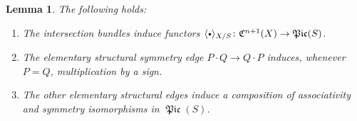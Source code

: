 \documentclass[11pt]{article}
\newcommand{\sbullet}{{\scriptscriptstyle\bullet}}
\newcommand{\csbullet}{{\raisebox{1pt}{$\sbullet$}}}
\theoremstyle{plain}
\newtheorem{lemma}[theorem]{Lemma}
\theoremstyle{definition}
\newcommand{\Cfrak}{\mathfrak C}
\DeclareMathOperator{\Picfr}{\mathfrak{Pic}}
\begin{document}
\begin{lemma}\label{lemma:Elkik-functor-free-category}
The following holds:
\begin{enumerate}
\item\label{item:Elkik-functor-free-category-1} The intersection bundles induce functors $\langle\csbullet\rangle_{X/S}\colon\Cfrak^{n+1}(X) \to \Picfr(S)$.
\item\label{item:Elkik-functor-free-category-2} The elementary structural symmetry edge $P \cdot Q \to Q \cdot P$ induces, whenever $P =Q$, multiplication by a sign.
\item\label{item:Elkik-functor-free-category-3} The other elementary structural edges induce a composition of associativity and symmetry isomorphisms in $\Picfr(S)$.
\end{enumerate}
\end{lemma}
\end{document}
